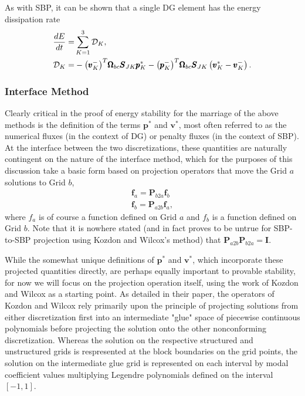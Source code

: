 As with SBP, it can be shown that a single DG element has
the energy dissipation rate
\begin{align}
  \frac{dE}{dt} = & \sum_{K=1}^{3} \mathcal{D}_{K},\\
  \mathcal{D}_{K} = &
  - {\left(\pmb{v}_{K}^{-}\right)}^{T}\pmb{\Omega}_{bc}\pmb{S}_{JK}\pmb{p}_{K}^{*}
  - {\left(\pmb{p}_{K}^{-}\right)}^{T}\pmb{\Omega}_{bc}\pmb{S}_{JK}
  \left(\pmb{v}^{*}_{K} - \pmb{v}^{-}_{K}\right). \label{eq:dg_diss}
\end{align}

\subsubsection{Interface Method} \label{sec:interface}

Clearly critical in the proof of energy stability for the marriage of the
above methods is the definition of the terms $\pmb{p}^*$ and $\pmb{v}^*$, most
often referred to as the numerical fluxes (in the context of DG) or penalty fluxes
(in the context of SBP). At the interface between the two discretizations, these
quantities are naturally contingent on the nature of the interface method, which
for the purposes of this discussion take a basic form based on projection operators
that move the Grid $a$ solutions to Grid $b$,
\begin{align}
\pmb{f}_{a} = \pmb{P}_{b2a}\pmb{f}_{b} \\
\pmb{f}_{b} = \pmb{P}_{a2b}\pmb{f}_{a},
\end{align}
where $f_{a}$ is of course a function defined on Grid $a$ and $f_{b}$ is a function
defined on Grid $b$. Note that it is nowhere stated (and in fact proves to be untrue
for SBP-to-SBP projection using Kozdon and Wilcox's method) that $\pmb{P}_{a2b}\pmb{P}_{b2a} = \pmb{I}$.

While the somewhat unique definitions of $\pmb{p}^{*}$ and
$\pmb{v}^{*}$, which incorporate these projected quantities directly, are perhaps
equally important to provable stability, for now we will focus on the projection
operation itself, using the work of Kozdon and Wilcox as a starting point.
As detailed in their paper, the operators of Kozdon and Wilcox rely primarily
upon the principle of projecting solutions from either discretization
first into an intermediate "glue" space of piecewise continuous polynomials
before projecting the solution onto the other nonconforming discretization. Whereas
the solution on the respective structured and unstructured grids is respresented at
the block boundaries on the grid points, the solution on the intermediate glue grid
is represented on each interval by modal coefficient values multiplying Legendre
polynomials defined on the interval $[-1,1]$.

